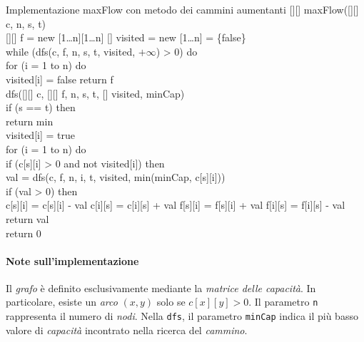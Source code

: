 \begin{minicode}{Implementazione maxFlow con metodo dei cammini aumentanti}
\ind{}[][] maxFlow([][] c,  n,  s,  t)\\
    [][] f = new [1\dots n][1\dots n]\hfill{}
    [] visited = new [1\dots n] = \{false\}\\
    \indf while (dfs(c, f, n, s, t, visited, $+\infty$) > 0) do\\
        \indff for (i = 1 to n) do\\
            visited[i] = false\hfill{}
    \indf return f\\

\nl{}
\rmindent\ind{} dfs([][] c, [][] f,   n,  s,
     t, [] visited, \:minCap)\\
    \indf if (s == t) then\\
        return min\\
    \indf visited[i] = true\\
    \indf for (i = 1 to n) do\\
        \indff if (c[s][i] > 0 and not visited[i]) then\\
             val = dfs(c, f, n, i, t, visited, min(minCap, c[s][i]))\\
            \indfff if (val > 0) then\\
                c[s][i] = c[s][i] - val\hfill{}
                c[i][s] = c[i][s] + val\hfill{}
                f[s][i] = f[s][i] + val\hfill{}
                f[i][s] = f[i][s] - val\hfill{}
                return val\\
    \indf return 0\hfill{}
\end{minicode}

\paragraph{Note sull'implementazione}
Il \emph{grafo} è definito esclusivamente mediante la \emph{matrice delle
capacità}. In particolare, esiste un \emph{arco} $(x,y)$ solo se $c[x][y]>0$.
Il parametro \texttt{n} rappresenta il numero di \emph{nodi}. Nella
\texttt{dfs}, il parametro \texttt{minCap} indica il più basso valore di
\emph{capacità} incontrato nella ricerca del \emph{cammino}.

